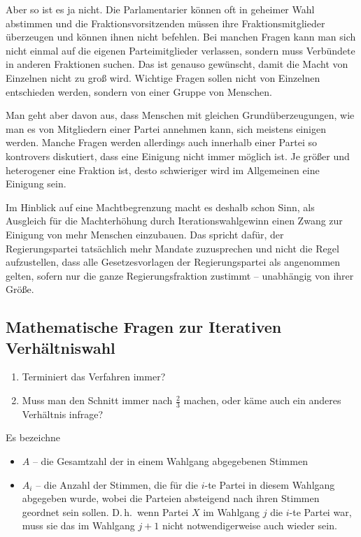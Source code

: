 Aber so ist es ja nicht. Die Parlamentarier können oft in geheimer Wahl abstimmen und die
Fraktionsvorsitzenden müssen ihre Fraktionsmitglieder überzeugen und können ihnen nicht
befehlen. Bei manchen Fragen kann man sich nicht einmal auf die eigenen Parteimitglieder
verlassen, sondern muss Verbündete in anderen Fraktionen suchen. Das ist genauso gewünscht,
damit die Macht von Einzelnen nicht zu groß wird. Wichtige Fragen sollen nicht von Einzelnen
entschieden werden, sondern von einer Gruppe von Menschen.

Man geht aber davon aus, dass Menschen
mit gleichen Grundüberzeugungen, wie man es von Mitgliedern einer Partei annehmen kann, sich
meistens einigen werden. Manche Fragen werden allerdings auch innerhalb einer Partei so
kontrovers diskutiert, dass eine Einigung nicht immer möglich ist. Je größer und heterogener eine
Fraktion ist, desto schwieriger wird im Allgemeinen eine Einigung sein.

Im Hinblick auf eine
Machtbegrenzung macht es deshalb schon Sinn, als Ausgleich für die Machterhöhung durch
Iterationswahlgewinn einen Zwang zur Einigung von mehr Menschen einzubauen. Das spricht dafür,
der Regierungspartei tatsächlich mehr Mandate zuzusprechen und nicht die Regel aufzustellen, dass
alle Gesetzesvorlagen der Regierungspartei als angenommen gelten, sofern nur die ganze
Regierungsfraktion zustimmt -- unabhängig von ihrer Größe.

\subsection{Mathematische Fragen zur Iterativen Verhältniswahl}

\begin{enumerate}
  \item Terminiert das Verfahren immer?
  \item Muss man den Schnitt immer nach $\tfrac{2}{3}$ machen, oder käme auch ein anderes
    Verhältnis infrage?
\end{enumerate}

Es bezeichne

\begin{itemize}[label={}]
  \item $A$ -- die Gesamtzahl der in einem Wahlgang abgegebenen Stimmen
  \item $A_i$ -- die Anzahl der Stimmen, die für die $i$-te Partei in diesem Wahlgang abgegeben
    wurde, wobei die Parteien absteigend nach ihren Stimmen geordnet sein sollen. D.\,h.\ wenn
    Partei $X$ im Wahlgang $j$ die $i$-te Partei war, muss sie das im Wahlgang $j+1$ nicht
    notwendigerweise auch wieder sein.
\end{itemize}

